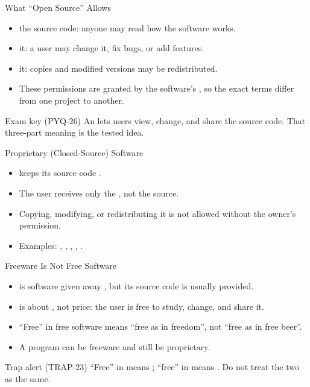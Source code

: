 \documentclass[aspectratio=169]{beamer}
\begin{document}
\begin{frame}{What ``Open Source'' Allows}
  \begin{itemize}
    \item {} the source code: anyone may read how the software works.
    \item {} it: a user may change it, fix bugs, or add features.
    \item {} it: copies and modified versions may be redistributed.
    \item These permissions are granted by the software's , so the
      exact terms differ from one project to another.
  \end{itemize}
  \begin{alertblock}{Exam key (PYQ-26)}
    An  lets users view, change, and share the source
    code. That three-part meaning is the tested idea.
  \end{alertblock}
\end{frame}

\begin{frame}{Proprietary (Closed-Source) Software}
  \begin{itemize}
    \item {} keeps its source code .
    \item The user receives only the , not the source.
    \item Copying, modifying, or redistributing it is not allowed without the
      owner's permission.
    \item Examples: , ,
      , , .
  \end{itemize}
\end{frame}

\begin{frame}{Freeware Is Not Free Software}
  \begin{itemize}
    \item {} is software given away , but its
      source code is usually  provided.
    \item {} is about , not price: the user is
      free to study, change, and share it.
    \item ``Free'' in free software means ``free as in freedom'', not
      ``free as in free beer''.
    \item A program can be freeware and still be proprietary.
  \end{itemize}
  \begin{alertblock}{Trap alert (TRAP-23)}
    ``Free'' in  means ; ``free'' in  means . Do not treat the two as the same.
  \end{alertblock}
\end{frame}
\end{document}
